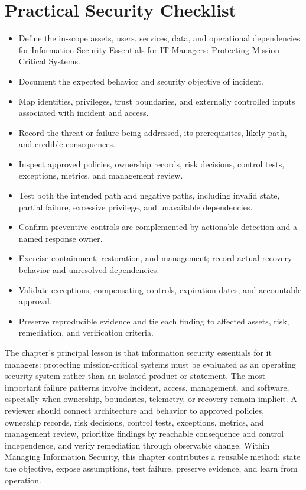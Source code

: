 \documentclass[11pt]{article}
\begin{document}
\section*{Practical Security Checklist}
\begin{itemize}[label=$\square$]
\item Define the in-scope assets, users, services, data, and operational dependencies for Information Security Essentials for IT Managers: Protecting Mission-Critical Systems.
\item Document the expected behavior and security objective of incident.
\item Map identities, privileges, trust boundaries, and externally controlled inputs associated with incident and access.
\item Record the threat or failure being addressed, its prerequisites, likely path, and credible consequences.
\item Inspect approved policies, ownership records, risk decisions, control tests, exceptions, metrics, and management review.
\item Test both the intended path and negative paths, including invalid state, partial failure, excessive privilege, and unavailable dependencies.
\item Confirm preventive controls are complemented by actionable detection and a named response owner.
\item Exercise containment, restoration, and management; record actual recovery behavior and unresolved dependencies.
\item Validate exceptions, compensating controls, expiration dates, and accountable approval.
\item Preserve reproducible evidence and tie each finding to affected assets, risk, remediation, and verification criteria.
\end{itemize}
\begin{synthesisbox}
The chapter's principal lesson is that information security essentials for it managers: protecting mission-critical systems must be evaluated as an operating security system rather than an isolated product or statement. The most important failure patterns involve incident, access, management, and software, especially when ownership, boundaries, telemetry, or recovery remain implicit. A reviewer should connect architecture and behavior to approved policies, ownership records, risk decisions, control tests, exceptions, metrics, and management review, prioritize findings by reachable consequence and control independence, and verify remediation through observable change. Within Managing Information Security, this chapter contributes a reusable method: state the objective, expose assumptions, test failure, preserve evidence, and learn from operation.
\end{synthesisbox}
\end{document}
